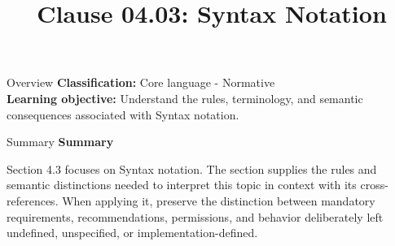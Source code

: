 \documentclass[10pt,letterpaper]{article}
\title{Clause 04.03: Syntax Notation}
\author{}
\date{}
\begin{document}
\maketitle
\begin{CornellOverviewBox}{Overview}
\textbf{Classification:} Core language - Normative\\[2pt]
\textbf{Learning objective:} Understand the rules, terminology, and semantic consequences associated with Syntax notation.
\end{CornellOverviewBox}\begin{CornellSummaryBox}{Summary}
{\sffamily\bfseries\color{Accent} Summary}\par\vspace{3pt}Section 4.3 focuses on Syntax notation. The section supplies the rules and semantic distinctions needed to interpret this topic in context with its cross-references. When applying it, preserve the distinction between mandatory requirements, recommendations, permissions, and behavior deliberately left undefined, unspecified, or implementation-defined.
\end{CornellSummaryBox}
\end{document}
